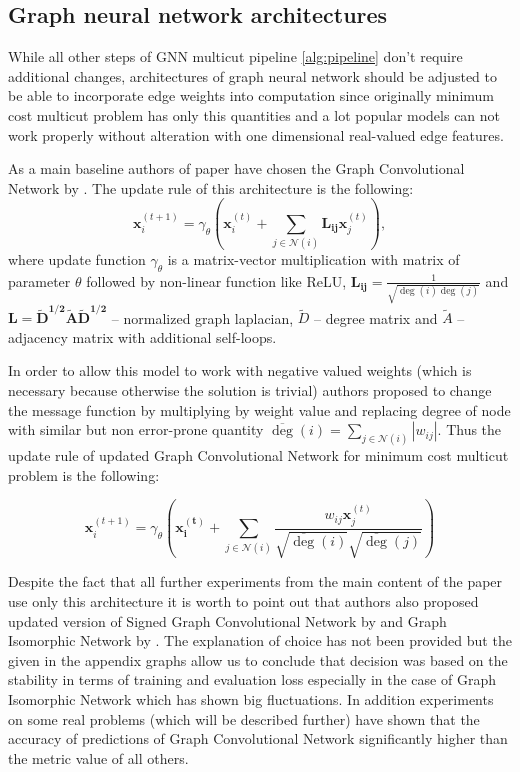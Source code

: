 \documentclass[10pt, twocolumn, a4paper]{article}
\theoremstyle{definition}
\begin{document}
\subsection{Graph neural network architectures} \label{sec:architectures}
While all other steps of GNN multicut pipeline \ref{alg:pipeline} don't require
additional changes, architectures of graph neural network should be adjusted to be able to incorporate
edge weights into computation since originally minimum cost multicut problem has only this quantities and
a lot popular models can not work properly without alteration with one dimensional real-valued edge features.

As a main baseline authors of paper have chosen the Graph Convolutional Network by \citet{kipf2016semi}.
The update rule of this architecture is the following:
\[
    \mathbf{x}_i^{(t+1)} = \gamma_{\theta} \left( \mathbf{x}_i^{(t)} +
    \sum\limits_{j \in \mathcal{N}(i)} \mathbf{L_{ij}} \mathbf{x}_j^{(t)} \right),
\]
where update function $\gamma_{\theta}$ is a matrix-vector multiplication with matrix of parameter $\theta$ followed by
non-linear function like ReLU, $\mathbf{L_{ij}} = \frac{1}{\sqrt{\deg(i) \deg(j)}}$ and
$\mathbf{L} = \mathbf{\tilde{D}^{1/2} \tilde{A} \tilde{D}^{1/2}}$ -- normalized graph laplacian, $\tilde{D}$ --
degree matrix and $\tilde{A}$ -- adjacency matrix with additional self-loops.

In order to allow this model to work with negative valued weights (which is necessary because otherwise
the solution is trivial) authors proposed to change the message function by multiplying by weight value and
replacing degree of node with similar but non error-prone quantity
$\overline{\deg}(i) = \sum\limits_{j \in \mathcal{N}(i)} |w_{ij}|$. Thus the update rule of updated
Graph Convolutional Network for minimum cost multicut problem is the following:

\[
    \mathbf{x}_i^{(t+1)} = \gamma_{\theta} \left(
    \mathbf{x^{(t)}_i} +
    \sum_{j \in \mathcal{N}(i)}
    \frac{w_{ij} \mathbf{x}_j^{(t)}}
    {\sqrt{\overline{\deg}(i)} \sqrt{\overline{\deg}(j)}}
    \right)
\]

Despite the fact that all further experiments from the main content of the paper use only this architecture
it is worth to point out that authors also proposed updated version of Signed
Graph Convolutional Network by \citet{derr2018signed} and Graph Isomorphic Network by \citet{xu2018powerful}.
The explanation of choice has not been provided but the given in the appendix graphs allow us to conclude
that decision was based on the stability in terms of training and evaluation loss especially in the case
of Graph Isomorphic Network which has shown big fluctuations. In addition experiments on some
real problems (which will be described further)  have shown that the accuracy of predictions of
Graph Convolutional Network significantly higher than the metric value of all others.
\end{document}
